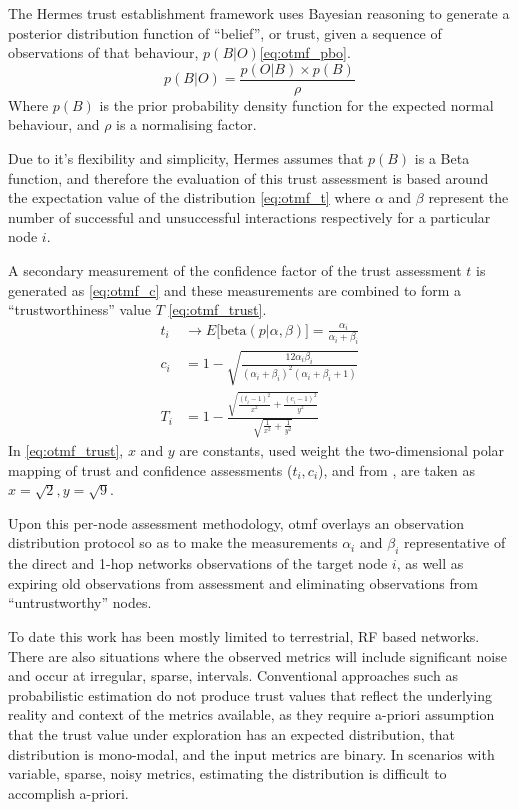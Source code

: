 The Hermes trust establishment framework \cite{Zouridaki2005} uses Bayesian reasoning to generate a posterior distribution function of ``belief'', or trust, given a sequence of observations of that behaviour, $p(B|O)$\eqref{eq:otmf_pbo}.
%
\begin{equation}
  p(B|O)  = \frac{p(O|B) \times p(B)}{\rho}
  \label{eq:otmf_pbo}
\end{equation}
%
Where $p(B)$ is the prior probability density function for the expected normal behaviour, and $\rho$ is a normalising factor.

Due to it's flexibility and simplicity, Hermes assumes that $p(B)$ is a Beta function, and therefore the evaluation of this trust assessment is based around the expectation value of the distribution \eqref{eq:otmf_t}  where $\alpha$ and $\beta$ represent the number of successful and unsuccessful interactions respectively for a particular node $i$.

A secondary measurement of the confidence factor of the trust assessment $t$ is generated as \eqref{eq:otmf_c} and these measurements are combined to form a ``trustworthiness'' value $T$ \eqref{eq:otmf_trust}.
%
\begin{align}
  t_i &\to E\lbrack\text{beta}(p|\alpha,\beta)\rbrack = \frac{\alpha_i}{\alpha_i+\beta_i} \label{eq:otmf_t}\\[5pt]
  c_i &= 1 - \sqrt{\frac{12\alpha_i\beta_i}{(\alpha_i+\beta_i)^2(\alpha_i+\beta_i+1)}} \label{eq:otmf_c}\\[5pt]
  T_i &= 1 - \frac{\sqrt{\frac{(t_i-1)^2}{x^2} + \frac{(c_i-1)^2}{y^2}}}{\sqrt{\frac{1}{x^2}+\frac{1}{y^2}}} \label{eq:otmf_trust}
\end{align}
%
In \eqref{eq:otmf_trust}, $x$ and $y$ are constants, used weight the two-dimensional polar mapping of trust and confidence assessments ($t_i,c_i$), and from \cite{Zouridaki2005}, are taken as $x=\sqrt{2},y=\sqrt{9}$.

Upon this per-node assessment methodology, \gls{otmf} overlays an observation distribution protocol so as to make the measurements $\alpha_i$ and $\beta_i$ representative of the direct and 1-hop networks observations of the target node $i$, as well as expiring old observations from assessment and eliminating observations from ``untrustworthy'' nodes.

To date this work has been mostly limited to terrestrial, RF based networks.
There are also situations where the observed metrics will include significant noise and occur at irregular, sparse, intervals.
Conventional approaches such as probabilistic estimation do not produce trust values that reflect the underlying reality and context of the metrics available, as they require a-priori assumption that the trust value under exploration has an expected distribution, that distribution is mono-modal, and the input metrics are binary.
In scenarios with variable, sparse, noisy metrics, estimating the distribution is difficult to accomplish a-priori.

